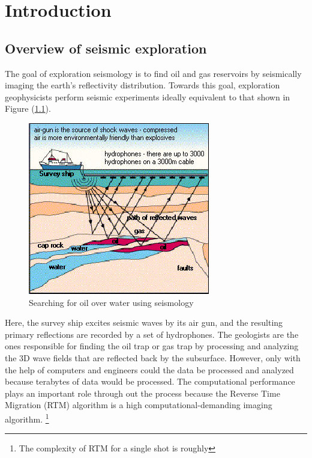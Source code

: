 \chapter{Introduction}

\section{Overview of seismic exploration}
The goal of exploration seismology is to find oil and gas reservoirs
by seismically imaging the earth's reflectivity distribution. Towards
this goal, exploration geophysicists perform seismic experiments ideally
equivalent to that shown in Figure (\ref{fig:oil-drilling}).

\begin{figure}[h]
\centering
\includegraphics[scale=0.65]{img/oil-drilling-prospecting2.jpg}
\caption{Searching for oil over water using seismology}
\label{fig:oil-drilling}
\end{figure}

Here,
the survey ship excites seismic waves by its air gun, and the resulting
primary reflections are recorded by a set of hydrophones. The geologists
are the ones responsible for finding the oil trap or gas trap by processing
and analyzing the 3D wave fields that are reflected back by the subsurface.
However, only with the help of computers and engineers could the data
be processed and analyzed because terabytes of data would be processed.
The computational performance plays an important role through out
the process because the Reverse Time Migration (RTM) algorithm is
a high computational-demanding imaging algorithm.%
\footnote{The complexity of RTM for a single shot is roughly %
}

